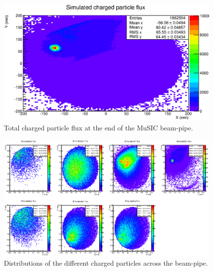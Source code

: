 \begin{figure}[hptb]
  \centering
  \includegraphics[width=.9\textwidth]{images/sim_2d_charged_particle_flux.eps}
  \caption{Total charged particle flux at the end of the MuSIC beam-pipe.}
  \label{fig:images_sim_2d_charged_particle_flux}
\end{figure}

\begin{figure}
  \centering
    \includegraphics[width=.9\textwidth]{images/sim_2d_per_pid_flux.eps}
  \caption{Distributions of the different charged particles across the beam-pipe.}
  \label{fig:images_sim_2d_per_pid_flux}
\end{figure}

